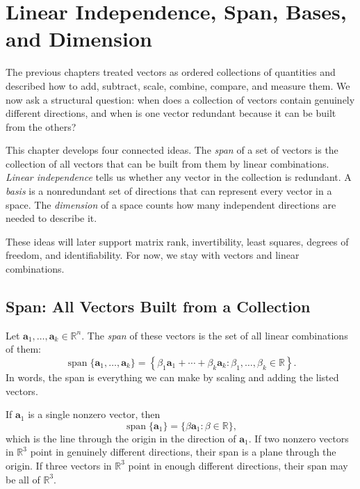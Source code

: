 \chapter{Linear Independence, Span, Bases, and Dimension}
\label{mf:ch06-linear-independence-span-bases-dimension}

The previous chapters treated vectors as ordered collections of quantities and described how to add, subtract, scale, combine, compare, and measure them. We now ask a structural question: when does a collection of vectors contain genuinely different directions, and when is one vector redundant because it can be built from the others?

This chapter develops four connected ideas. The \emph{span} of a set of vectors is the collection of all vectors that can be built from them by linear combinations. \emph{Linear independence} tells us whether any vector in the collection is redundant. A \emph{basis} is a nonredundant set of directions that can represent every vector in a space. The \emph{dimension} of a space counts how many independent directions are needed to describe it.

These ideas will later support matrix rank, invertibility, least squares, degrees of freedom, and identifiability. For now, we stay with vectors and linear combinations.

\section{Span: All Vectors Built from a Collection}
\label{mf:span}

Let \(\mathbf{a}_1,\ldots,\mathbf{a}_k\in\mathbb{R}^n\). The \emph{span} of these vectors is the set of all linear combinations of them:
\[
    \operatorname{span}\{\mathbf{a}_1,\ldots,\mathbf{a}_k\}
    =
    \left\{\beta_1\mathbf{a}_1+\cdots+\beta_k\mathbf{a}_k:
    \beta_1,\ldots,\beta_k\in\mathbb{R}\right\}.
\]
In words, the span is everything we can make by scaling and adding the listed vectors.

If \(\mathbf{a}_1\) is a single nonzero vector, then
\[
    \operatorname{span}\{\mathbf{a}_1\}=\{\beta\mathbf{a}_1:\beta\in\mathbb{R}\},
\]
which is the line through the origin in the direction of \(\mathbf{a}_1\). If two nonzero vectors in \(\mathbb{R}^3\) point in genuinely different directions, their span is a plane through the origin. If three vectors in \(\mathbb{R}^3\) point in enough different directions, their span may be all of \(\mathbb{R}^3\).

